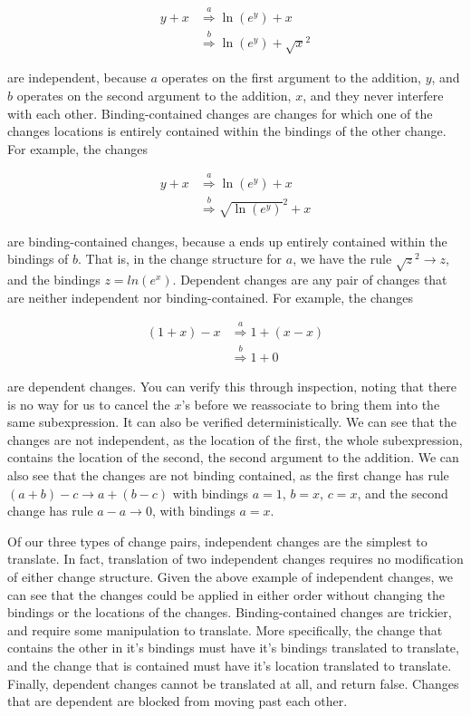 \documentclass{article}
\newcommand{\insetarrow}[1]{\stackrel{#1}{\Rightarrow}}
\newcommand{\lnexp}[1]{\ln{\left(e^{#1}\right)}}
\begin{document}
\begin{align*}
y + x &\insetarrow{a} \lnexp{y} + x \\
&\insetarrow{b} \lnexp{y} + \sqrt{x}^2
\end{align*}

are independent, 
because $a$ operates 
on the first argument to the addition, 
$y$, 
and $b$ operates 
on the second argument to the addition, 
$x$, 
and they never interfere with each other. 
Binding-contained changes are changes 
for which one of the changes locations 
is entirely contained within the bindings of the other change. 
For example, 
the changes 

\begin{align*}
y + x &\insetarrow{a} \lnexp{y} + x \\
&\insetarrow{b} \sqrt{\lnexp{y}}^2 + x
\end{align*}

are binding-contained changes, 
because a ends up entirely contained within the bindings of $b$. 
That is, 
in the change structure for $a$, 
we have the rule $\sqrt{z}^2 \to z$,
and the bindings $z = ln\left(e^x\right)$.
Dependent changes are any pair of changes 
that are neither independent nor binding-contained. 
For example, 
the changes 

\begin{align*}
(1 + x) - x &\insetarrow{a} 1 + (x - x) \\
&\insetarrow{b} 1 + 0
\end{align*}

are dependent changes. 
You can verify this through inspection, 
noting that there is no way 
for us to cancel the $x$'s 
before we reassociate 
to bring them into the same subexpression. 
It can also be verified deterministically. 
We can see that the changes are not independent, 
as the location of the first, 
the whole subexpression, 
contains the location of the second, 
the second argument to the addition. 
We can also see that the changes are not binding contained, 
as the first change has rule $(a + b) - c \to a + (b - c)$
with bindings $a = 1$, 
$b = x$, 
$c = x$, 
and the second change has rule $a - a \to 0$, 
with bindings $a = x$.

Of our three types of change pairs, 
independent changes are the simplest to translate. 
In fact, 
translation of two independent changes 
requires no modification of either change structure. 
Given the above example of independent changes, 
we can see that the changes could be applied 
in either order 
without changing the bindings 
or the locations of the changes. 
Binding-contained changes are trickier, 
and require some manipulation to translate. 
More specifically, 
the change that contains the other in it's 
bindings must have it's bindings translated 
to translate, 
and the change that is contained 
must have it's location translated 
to translate. 
Finally, dependent changes cannot be translated at all, 
and return false. 
Changes that are dependent 
are blocked from moving past each other.
\end{document}
